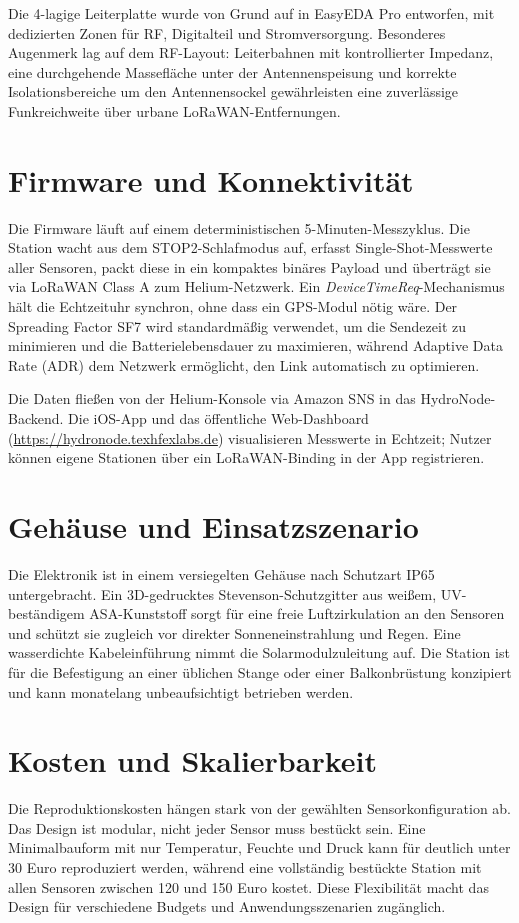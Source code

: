 Die 4-lagige Leiterplatte wurde von Grund auf in EasyEDA Pro entworfen, mit dedizierten Zonen für RF, Digitalteil und Stromversorgung. Besonderes Augenmerk lag auf dem RF-Layout: Leiterbahnen mit kontrollierter Impedanz, eine durchgehende Massefläche unter der Antennenspeisung und korrekte Isolationsbereiche um den Antennensockel gewährleisten eine zuverlässige Funkreichweite über urbane LoRaWAN-Entfernungen.

\section*{Firmware und Konnektivität}

Die Firmware läuft auf einem deterministischen 5-Minuten-Messzyklus. Die Station wacht aus dem STOP2-Schlafmodus auf, erfasst Single-Shot-Messwerte aller Sensoren, packt diese in ein kompaktes binäres Payload und überträgt sie via LoRaWAN Class A zum Helium-Netzwerk. Ein \textit{DeviceTimeReq}-Mechanismus hält die Echtzeituhr synchron, ohne dass ein GPS-Modul nötig wäre. Der Spreading Factor SF7 wird standardmäßig verwendet, um die Sendezeit zu minimieren und die Batterielebensdauer zu maximieren, während Adaptive Data Rate (ADR) dem Netzwerk ermöglicht, den Link automatisch zu optimieren.

Die Daten fließen von der Helium-Konsole via Amazon SNS in das HydroNode-Backend. Die iOS-App und das öffentliche Web-Dashboard (\url{https://hydronode.texhfexlabs.de}) visualisieren Messwerte in Echtzeit; Nutzer können eigene Stationen über ein LoRaWAN-Binding in der App registrieren.

\section*{Gehäuse und Einsatzszenario}

Die Elektronik ist in einem versiegelten Gehäuse nach Schutzart IP65 untergebracht. Ein 3D-gedrucktes Stevenson-Schutzgitter aus weißem, UV-beständigem ASA-Kunststoff sorgt für eine freie Luftzirkulation an den Sensoren und schützt sie zugleich vor direkter Sonneneinstrahlung und Regen. Eine wasserdichte Kabeleinführung nimmt die Solarmodulzuleitung auf. Die Station ist für die Befestigung an einer üblichen Stange oder einer Balkonbrüstung konzipiert und kann monatelang unbeaufsichtigt betrieben werden.

\section*{Kosten und Skalierbarkeit}

Die Reproduktionskosten hängen stark von der gewählten Sensorkonfiguration ab. Das Design ist modular, nicht jeder Sensor muss bestückt sein. Eine Minimalbauform mit nur Temperatur, Feuchte und Druck kann für deutlich unter 30 Euro reproduziert werden, während eine vollständig bestückte Station mit allen Sensoren zwischen 120 und 150 Euro kostet. Diese Flexibilität macht das Design für verschiedene Budgets und Anwendungsszenarien zugänglich.
